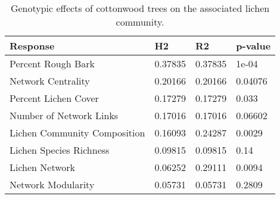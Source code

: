 \begin{table}[ht]
\centering
\begin{tabular}{llll}
  \hline
Response & H2 & R2 & p-value \\ 
  \hline
Percent Rough Bark & 0.37835 & 0.37835 & 1e-04 \\ 
  Network Centrality & 0.20166 & 0.20166 & 0.04076 \\ 
  Percent Lichen Cover & 0.17279 & 0.17279 & 0.033 \\ 
  Number of Network Links & 0.17016 & 0.17016 & 0.06602 \\ 
  Lichen Community Composition & 0.16093 & 0.24287 & 0.0029 \\ 
  Lichen Species Richness & 0.09815 & 0.09815 & 0.14 \\ 
  Lichen Network & 0.06252 & 0.29111 & 0.0094 \\ 
  Network Modularity & 0.05731 & 0.05731 & 0.2809 \\ 
   \hline
\end{tabular}
\caption{Genotypic effects of cottonwood trees on the associated lichen community.} 
\label{tab:h2_table}
\end{table}
